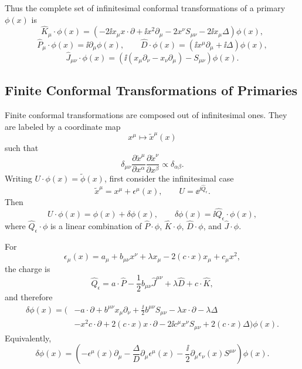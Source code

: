 Thus the complete set of infinitesimal conformal transformations of a
primary \(\phi(x)\) is
\[
  \widehat K_\mu\cdot\phi(x)
  =
  \left(
    -2\ii x_\mu x\cdot\partial
    +\ii x^2\partial_\mu
    -2x^\nu S_{\mu\nu}
    -2\ii x_\mu\Delta
  \right)\phi(x),
\]
\[
  \widehat P_\mu\cdot\phi(x)
  =
  \ii\partial_\mu\phi(x),
  \qquad
  \widehat D\cdot\phi(x)
  =
  \left(\ii x^\mu\partial_\mu+\ii\Delta\right)\phi(x),
\]
\[
  \widehat J_{\mu\nu}\cdot\phi(x)
  =
  \left(
    \ii(x_\mu\partial_\nu-x_\nu\partial_\mu)-S_{\mu\nu}
  \right)\phi(x).
\]

\subsection{Finite Conformal Transformations of Primaries}

Finite conformal transformations are composed out of infinitesimal ones.
They are labeled by a coordinate map
\[
  x^\mu\longmapsto \widetilde x^\mu(x)
\]
such that
\[
  \delta_{\mu\nu}
  \frac{\partial\widetilde x^\mu}{\partial x^\alpha}
  \frac{\partial\widetilde x^\nu}{\partial x^\beta}
  \propto
  \delta_{\alpha\beta}.
\]
Writing \(U\cdot\phi(x)=\widetilde\phi(x)\), first consider the
infinitesimal case
\[
  \widetilde x^\mu=x^\mu+\epsilon^\mu(x),
  \qquad
  U=\ee^{\ii\widehat Q_\epsilon}.
\]
Then
\[
  U\cdot\phi(x)=\phi(x)+\delta\phi(x),
  \qquad
  \delta\phi(x)=\ii\widehat Q_\epsilon\cdot\phi(x),
\]
where \(\widehat Q_\epsilon\cdot\phi\) is a linear combination of
\(\widehat P\cdot\phi\), \(\widehat K\cdot\phi\), \(\widehat D\cdot\phi\),
and \(\widehat J\cdot\phi\).

For
\[
  \epsilon_\mu(x)
  =
  a_\mu+b_{\mu\nu}x^\nu+\lambda x_\mu
  -2(c\cdot x)x_\mu+c_\mu x^2,
\]
the charge is
\[
  \widehat Q_\epsilon
  =
  a\cdot\widehat P
  -\frac12 b_{\mu\nu}\widehat J^{\mu\nu}
  +\lambda\widehat D
  +c\cdot\widehat K,
\]
and therefore
\[
\begin{aligned}
  \delta\phi(x)
  =
  \Big(
    &-a\cdot\partial
    +b^{\mu\nu}x_\mu\partial_\nu
    +\frac{\ii}{2}b^{\mu\nu}S_{\mu\nu}
    -\lambda x\cdot\partial
    -\lambda\Delta  \\
    &-x^2c\cdot\partial
    +2(c\cdot x)x\cdot\partial
    -2\ii c^\mu x^\nu S_{\mu\nu}
    +2(c\cdot x)\Delta
  \Big)\phi(x).
\end{aligned}
\]
Equivalently,
\[
  \delta\phi(x)
  =
  \left(
    -\epsilon^\mu(x)\partial_\mu
    -\frac{\Delta}{D}\partial_\mu\epsilon^\mu(x)
    -\frac{\ii}{2}\partial_\mu\epsilon_\nu(x)S^{\mu\nu}
  \right)\phi(x).
\]

